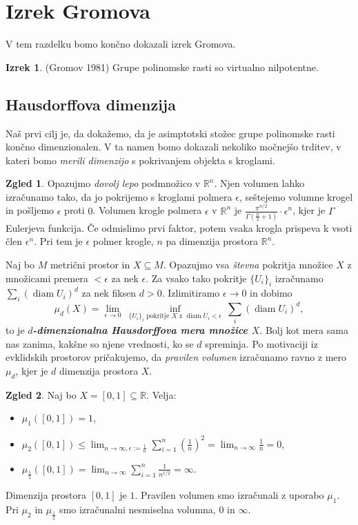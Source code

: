 \documentclass[11pt]{book}
\def\RR{\mathbb{R}}
\DeclareMathOperator\diam{diam}
\def\definicija{\color{rdeca}\bf\em}
\def\literatura{\color{modra}}
\theoremstyle{definition}
\theoremstyle{zgled}
\newtheorem*{zgled}{Zgled}
\theoremstyle{odprtproblem}
\theoremstyle{domacanaloga}
\theoremstyle{izrek}
\newtheorem*{izrek}{Izrek}
\begin{document}
\section{Izrek Gromova}

V tem razdelku bomo končno dokazali izrek Gromova.

\begin{izrek}{\literatura (Gromov 1981)}
Grupe polinomske rasti so virtualno nilpotentne.
\end{izrek}

\subsection{Hausdorffova dimenzija}

Naš prvi cilj je, da dokažemo, da je asimptotski stožec grupe polinomske rasti končno dimenzionalen. V ta namen bomo dokazali nekoliko močnejšo trditev, v kateri bomo {\em merili dimenzijo} s pokrivanjem objekta s kroglami.

\begin{zgled}
Opazujmo {\em dovolj lepo} podmnožico v $\RR^n$. Njen volumen lahko izračunamo tako, da jo pokrijemo s kroglami polmera $\epsilon$, seštejemo volumne krogel in pošljemo $\epsilon$ proti $0$. Volumen krogle polmera $\epsilon$ v $\RR^n$ je $\frac{\pi^{n/2}}{\Gamma(\frac{n}{2} + 1)} \cdot \epsilon^n$, kjer je $\Gamma$ Eulerjeva funkcija. Če odmislimo prvi faktor, potem vsaka krogla prispeva k vsoti člen $\epsilon^n$. Pri tem je $\epsilon$ polmer krogle, $n$ pa dimenzija prostora $\RR^n$.
\end{zgled}

Naj bo $M$ metrični prostor in $X \subseteq M$. Opazujmo vsa {\em števna} pokritja množice $X$ z množicami premera $< \epsilon$ za nek $\epsilon$. Za vsako tako pokritje $\{ U_i \}_i$ izračunamo $\sum_i (\diam U_i)^d$ za nek fiksen $d > 0$. Izlimitiramo $\epsilon \to 0$ in dobimo
\[
\mu_d(X) = \lim_{\epsilon \to 0} \ \inf_{\{ U_i \}_i \text{ pokritje $X$ z $\diam U_i < \epsilon$}} \ \sum_i (\diam U_i)^d,
 \]
to je {\definicija $d$-dimenzionalna Hausdorffova mera množice $X$}. Bolj kot mera sama nas zanima, kakšne so njene vrednosti, ko se $d$ spreminja. Po motivaciji iz evklidskih prostorov pričakujemo, da {\em pravilen volumen} izračunamo ravno z mero $\mu_d$, kjer je $d$ dimenzija prostora $X$.

\begin{zgled}
Naj bo $X = [0,1] \subseteq \RR$. Velja:
\begin{itemize}
    \item $\mu_1([0,1]) = 1$,
    \item $\mu_2([0,1]) \leq \lim_{n \to \infty, \epsilon := \frac{1}{n}} \sum_{i = 1}^n \left( \frac{1}{n} \right)^2 = \lim_{n \to \infty} \frac{1}{n} = 0$,
    \item $\mu_{\frac{1}{2}}([0,1]) = \lim_{n \to \infty} \sum_{i = 1}^n \frac{1}{n^{1/2}} = \infty$.
\end{itemize}
Dimenzija prostora $[0,1]$ je $1$. Pravilen volumen smo izračunali z uporabo $\mu_1$. Pri $\mu_2$ in $\mu_{\frac12}$ smo izračunalni nesmiselna volumna, $0$ in $\infty$.
\end{zgled}
\end{document}

